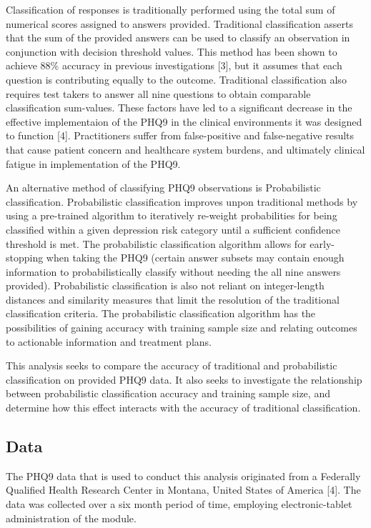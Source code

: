 \documentclass[12pt,]{article}
\begin{document}
Classification of responses is traditionally performed using the total
sum of numerical scores assigned to answers provided. Traditional
classification asserts that the sum of the provided answers can be used
to classify an observation in conjunction with decision threshold
values. This method has been shown to achieve 88\% accuracy in previous
investigations {[}3{]}, but it assumes that each question is
contributing equally to the outcome. Traditional classification also
requires test takers to answer all nine questions to obtain comparable
classification sum-values. These factors have led to a significant
decrease in the effective implementaion of the PHQ9 in the clinical
environments it was designed to function {[}4{]}. Practitioners suffer
from false-positive and false-negative results that cause patient
concern and healthcare system burdens, and ultimately clinical fatigue
in implementation of the PHQ9.

An alternative method of classifying PHQ9 observations is Probabilistic
classification. Probabilistic classification improves unpon traditional
methods by using a pre-trained algorithm to iteratively re-weight
probabilities for being classified within a given depression risk
category until a sufficient confidence threshold is met. The
probabilistic classification algorithm allows for early-stopping when
taking the PHQ9 (certain answer subsets may contain enough information
to probabilistically classify without needing the all nine answers
provided). Probabilistic classification is also not reliant on
integer-length distances and similarity measures that limit the
resolution of the traditional classification criteria. The probabilistic
classification algorithm has the possibilities of gaining accuracy with
training sample size and relating outcomes to actionable information and
treatment plans.

This analysis seeks to compare the accuracy of traditional and
probabilistic classification on provided PHQ9 data. It also seeks to
investigate the relationship between probabilistic classification
accuracy and training sample size, and determine how this effect
interacts with the accuracy of traditional classification.

\hypertarget{data}{%
\subsection{Data}\label{data}}

The PHQ9 data that is used to conduct this analysis originated from a
Federally Qualified Health Research Center in Montana, United States of
America {[}4{]}. The data was collected over a six month period of time,
employing electronic-tablet administration of the module.
\end{document}
